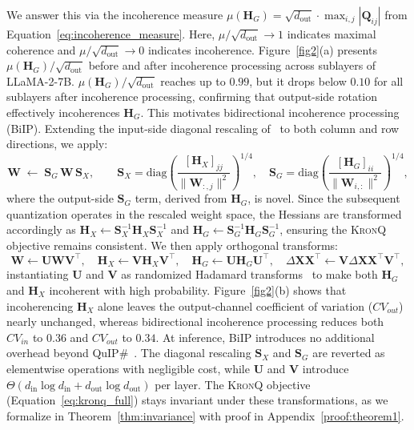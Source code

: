 \documentclass{article} %
\newcommand{\KronQ}{\textsc{KronQ}}
\newcommand{\yh}[1]{\textcolor{blue}{#1}}
\begin{document}
We answer this via the incoherence measure $\mu(\mathbf{H}_G) = \sqrt{d_{\mathrm{out}}} \cdot \max_{i,j} |\textbf{Q}_{ij}|$ from Equation~\eqref{eq:incoherence_measure}. Here, $\mu/\sqrt{d_{\mathrm{out}}} \to 1$ indicates maximal coherence and $\mu/\sqrt{d_{\mathrm{out}}} \to 0$ indicates incoherence. Figure~\ref{fig2}(a) presents $\mu(\mathbf{H}_G)/\sqrt{d_{\mathrm{out}}}$ before and after incoherence processing across sublayers of LLaMA-2-7B. $\mu(\mathbf{H}_G)/\sqrt{d_{\mathrm{out}}}$ reaches up to $0.99$, but it drops below $0.10$ for all sublayers after incoherence processing, confirming that output-side rotation effectively incoherences $\mathbf{H}_G$.
This motivates bidirectional incoherence processing (BiIP). Extending the input-side diagonal rescaling of~\citet{chee2023quip} to both column and row directions, we apply:
\begin{equation}
    \mathbf{W} \;\leftarrow\; \mathbf{S}_G\, \mathbf{W}\, \mathbf{S}_X,
\qquad
\mathbf{S}_X = \mathrm{diag}\!\left(\frac{[\mathbf{H}_X]_{jj}}
{\|\mathbf{W}_{:,j}\|^2}\right)^{1/4}\!,
\quad
\mathbf{S}_G = \mathrm{diag}\!\left(\frac{[\mathbf{H}_G]_{ii}}
{\|\mathbf{W}_{i,:}\|^2}\right)^{1/4}\!,
    \label{eq:rescale}
\end{equation}
where the output-side $\mathbf{S}_G$ term, derived from $\mathbf{H}_G$, is 
novel. Since the subsequent quantization operates in the rescaled weight space, the Hessians are transformed accordingly as $\mathbf{H}_X \leftarrow  \mathbf{S}_X^{-1} \mathbf{H}_X \mathbf{S}_X^{-1}$ and $\mathbf{H}_G \leftarrow \mathbf{S}_G^{-1} \mathbf{H}_G \mathbf{S}_G^{-1}$, ensuring the \KronQ{} objective remains consistent. We then apply orthogonal transforms:
\begin{equation}
    \mathbf{W} \leftarrow \mathbf{U} \mathbf{W} \mathbf{V}^\top,
    \quad
    \mathbf{H}_X \leftarrow \mathbf{V} \mathbf{H}_X \mathbf{V}^\top,
    \quad
    \mathbf{H}_G \leftarrow \mathbf{U} \mathbf{H}_G \mathbf{U}^\top,
    \quad
    \Delta\mathbf{X}\mathbf{X}^\top \leftarrow \mathbf{V} \Delta\mathbf{X}\mathbf{X}^\top \mathbf{V}^\top,
    \label{eq:biip}
\end{equation}
instantiating $\mathbf{U}$ and $\mathbf{V}$ as randomized Hadamard transforms~\citep{tseng2024quip} to make both $\mathbf{H}_G$ and $\mathbf{H}_X$ incoherent with high probability. Figure~\ref{fig2}(b) shows that incoherencing $\mathbf{H}_X$ alone leaves the output-channel coefficient of variation ($CV_{out}$) nearly unchanged, whereas bidirectional incoherence processing reduces both $CV_{in}$ to $0.36$ and $CV_{out}$ to $0.34$. At inference, BiIP introduces no additional overhead beyond QuIP\#~\citep{tseng2024quip}. The diagonal rescaling $\mathbf{S}_X$ and $\mathbf{S}_G$ are reverted as elementwise operations with negligible cost, while $\mathbf{U}$ and $\mathbf{V}$ introduce $\Theta(d_{\mathrm{in}} \log d_{\mathrm{in}} + d_{\mathrm{out}} \log d_{\mathrm{out}})$ per layer. The \KronQ{} objective (Equation~\eqref{eq:kronq_full}) stays invariant under these transformations, as we formalize in Theorem~\ref{thm:invariance} with proof in Appendix~\ref{proof:theorem1}.
\end{document}
